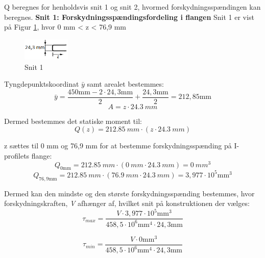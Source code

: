 Q beregnes for henholdsvis snit 1 og snit 2, hvormed forskydningsspændingen kan beregnes. 
\newline
\newline
\textbf{Snit 1: Forskydningsspændingsfordeling i flangen}
\newline
Snit 1 er vist på Figur \ref{fig:snitetforskyd}, hvor 0 mm < z < 76,9 mm

\begin{figure}[H]
	\centering
	\includegraphics[width=0.2\textwidth]{billeder/snitetforskydning.png}
	\caption{Snit 1}
	\label{fig:snitetforskyd}
\end{figure}

Tyngdepunktskoordinat $\bar{y}$ samt arealet bestemmes:
\begin{equation}
\bar{y} = \frac{450 \text{mm} - 2 \cdot 24,\!3 \text{mm}}{2} + \frac{24,\!3 \text{mm}}{2} = 212,\!85 \text{mm}
\end{equation}
\begin{equation}
A = z \cdot \SI{24,3}{mm}
\end{equation}

Dermed bestemmes det statiske moment til:
\begin{equation}
Q(z) = \SI{212,85}{mm} \cdot (z \cdot \SI{24,3}{mm})
\end{equation}

z sættes til 0 mm og 76,9 mm for at bestemme forskydningsspænding på I-profilets flange:
\begin{equation}
Q_{0 \text{mm}} = \SI{212,85}{mm} \cdot (\SI{0}{mm} \cdot \SI{24,3}{mm}) = \SI{0}{mm^3}
\end{equation} 
\begin{equation}
	Q_{76,9 \text{mm}} = \SI{212,85}{mm} \cdot (\SI{76,9}{mm} \cdot \SI{24,3}{mm}) =  3,\!977 \cdot 10^5 \text{mm}^3 
\end{equation}

Dermed kan den mindste og den største forskydningsspænding bestemmes, hvor forskydningskraften, \textit{V} afhænger af, hvilket snit på konstruktionen der vælges:
\begin{equation}
	\tau_{max} = \frac{V \cdot 3,977 \cdot 10^5 \text{mm}^3}{458,\!5 \cdot 10^6 \text{mm}^4 \cdot 24,\!3 \text{mm}}
\end{equation}

\begin{equation}
	\tau_{min} = \frac{V \cdot 0 \text{mm}^3}{458,\!5 \cdot 10^6 \text{mm}^4 \cdot 24,\!3 \text{mm}}
\end{equation}

